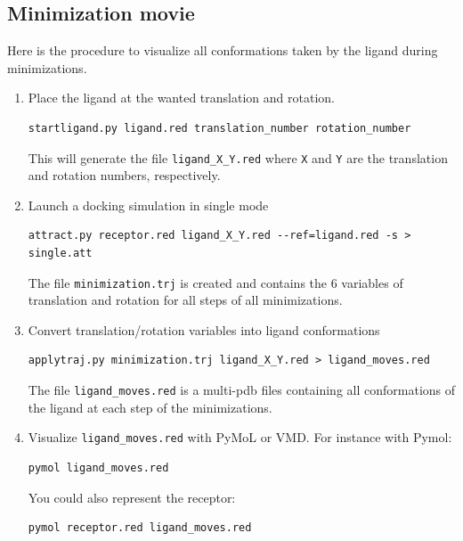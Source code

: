 \documentclass[12pt,a4paper]{article}
\begin{document}
\subsection{Minimization movie}

Here is the procedure to visualize all conformations taken by the ligand during minimizations.

\begin{enumerate}
\item Place the ligand at the wanted translation and rotation.
\begin{verbatim}
startligand.py ligand.red translation_number rotation_number
\end{verbatim}
This will generate the file \verb=ligand_X_Y.red= where \verb=X= and \verb=Y= are the translation and rotation numbers, respectively.
\item Launch a docking simulation in single mode
\begin{verbatim}
attract.py receptor.red ligand_X_Y.red --ref=ligand.red -s > single.att
\end{verbatim}
The file \verb=minimization.trj= is created and contains the 6 variables of translation and rotation for all steps of all minimizations.
\item Convert translation/rotation variables into ligand conformations
\begin{verbatim}
applytraj.py minimization.trj ligand_X_Y.red > ligand_moves.red
\end{verbatim}
The file \verb=ligand_moves.red= is a multi-pdb files containing all conformations of the ligand at each step of the minimizations.
\item Visualize \verb=ligand_moves.red= with PyMoL or VMD. For instance with Pymol:
\begin{verbatim}
pymol ligand_moves.red
\end{verbatim}
You could also represent the receptor:
\begin{verbatim}
pymol receptor.red ligand_moves.red
\end{verbatim}
\end{enumerate}

 

{}

\end{document}
